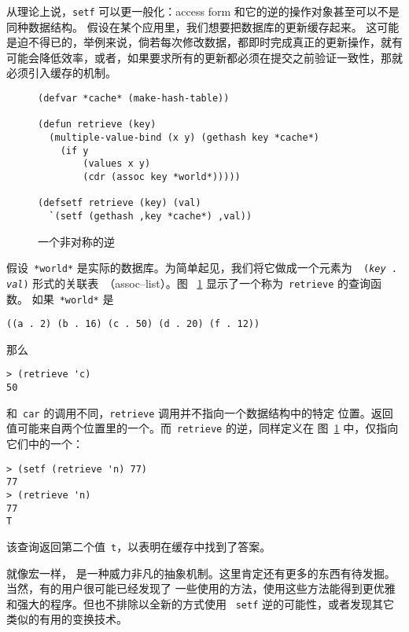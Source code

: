 从理论上说，\verb|setf| 可以更一般化：access form 和它的逆的操作对象甚至可以不是同种数据结构。
假设在某个应用里，我们想要把数据库的更新缓存起来。
这可能是迫不得已的，举例来说，倘若每次修改数据，都即时完成真正的更新操作，就有可能会降低效率，或者，如果要求所有的更新都必须在提交之前验证一致性，那就必须引入缓存的机制。

\begin{figure}
\begin{lstlisting}
(defvar *cache* (make-hash-table))

(defun retrieve (key)
  (multiple-value-bind (x y) (gethash key *cache*)
    (if y
        (values x y)
        (cdr (assoc key *world*)))))

(defsetf retrieve (key) (val)
  `(setf (gethash ,key *cache*) ,val))
\end{lstlisting}
  \caption{一个非对称的逆}
  \label{fig:an_asymmetric_inversion}
\end{figure}

假设~\texttt{*world*} 是实际的数据库。为简单起见，我们将它做成一个元素为~\texttt{
(\emph{key} . \emph{val})} 形式的关联表~（assoc--list）。图
~\ref{fig:an_asymmetric_inversion} 显示了一个称为~\texttt{retrieve} 的查询函数。
如果~\texttt{*world*} 是
\begin{lstlisting}
((a . 2) (b . 16) (c . 50) (d . 20) (f . 12))
\end{lstlisting}
那么
\begin{lstlisting}
> (retrieve 'c)
50
\end{lstlisting}
和~\verb|car| 的调用不同，\verb|retrieve| 调用并不指向一个数据结构中的特定
位置。返回值可能来自两个位置里的一个。而~\verb|retrieve| 的逆，同样定义在
图~\ref{fig:an_asymmetric_inversion} 中，仅指向它们中的一个：
\begin{lstlisting}
> (setf (retrieve 'n) 77)
77
> (retrieve 'n)
77
T
\end{lstlisting}
该查询返回第二个值~\verb|t|，以表明在缓存中找到了答案。

就像宏一样，\gv{} 是一种威力非凡的抽象机制。这里肯定还有更多的东西有待发掘。当然，有的用户很可能已经发现了
一些使用\gv{}的方法，使用这些方法能得到更优雅和强大的程序。但也不排除以全新的方式使用
~\verb|setf| 逆的可能性，或者发现其它类似的有用的变换技术。

